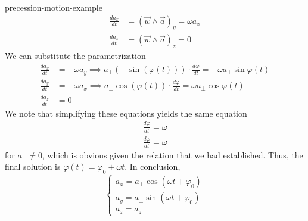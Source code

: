 \documentclass[preview]{standalone}
\begin{document}
\begin{snippetexample}{precession-motion-example}{}
\begin{align*}
        \frac{da_x}{dt} &= {(\vec{w} \wedge \vec{a})}_y
        = \omega a_x \\
        \frac{da_z}{dt} &= {(\vec{w} \wedge \vec{a})}_z
        = 0
    \end{align*}
    We can substitute the parametrization
    \begin{align*}
        \frac{da_x}{dt} &= -\omega a_y \implies a_\perp (-\sin(\varphi(t))) \cdot \frac{d\varphi}{dt} = -\omega a_\perp \sin\varphi(t) \\
        \frac{da_y}{dt} &= -\omega a_x \implies a_\perp \cos(\varphi(t)) \cdot \frac{d\varphi}{dt} = \omega a_\perp \cos\varphi(t) \\
        \frac{da_z}{dt} &= 0
    \end{align*}
    We note that simplifying these equations yields the same equation 
    \begin{align*}
        \frac{d\varphi}{dt} = \omega \\
        \frac{d\varphi}{dt} = \omega
    \end{align*}
    for \(a_\perp \neq 0\),
    which is obvious given the relation that we had established.
    Thus, the final solution is \(\varphi(t) = \varphi_0 + \omega t\).
    In conclusion,
    \[
        \begin{cases}
            a_x = a_\perp \cos(\omega t + \varphi_0) \\
            a_y = a_\perp \sin(\omega t + \varphi_0) \\
            a_z = a_z
        \end{cases}
    \]
\end{snippetexample}
\end{document}
